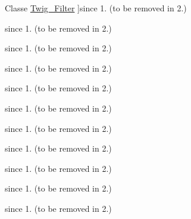 \begin{DoxyRefList}
Classe \hyperlink{class_twig___filter}{Twig\+\_\+\+Filter} ]since 1. (to be removed in 2.)  
\item[\label{deprecated__deprecated000017}%
\hypertarget{deprecated__deprecated000017}{}%
Classe \hyperlink{class_twig___filter___function}{Twig\+\_\+\+Filter\+\_\+\+Function} ]since 1. (to be removed in 2.)  
\item[\label{deprecated__deprecated000018}%
\hypertarget{deprecated__deprecated000018}{}%
Classe \hyperlink{class_twig___filter___method}{Twig\+\_\+\+Filter\+\_\+\+Method} ]since 1. (to be removed in 2.)  
\item[\label{deprecated__deprecated000019}%
\hypertarget{deprecated__deprecated000019}{}%
Classe \hyperlink{class_twig___filter___node}{Twig\+\_\+\+Filter\+\_\+\+Node} ]since 1. (to be removed in 2.)  
\item[\label{deprecated__deprecated000021}%
\hypertarget{deprecated__deprecated000021}{}%
Classe \hyperlink{interface_twig___filter_callable_interface}{Twig\+\_\+\+Filter\+Callable\+Interface} ]since 1. (to be removed in 2.)  
\item[\label{deprecated__deprecated000022}%
\hypertarget{deprecated__deprecated000022}{}%
Classe \hyperlink{interface_twig___filter_interface}{Twig\+\_\+\+Filter\+Interface} ]since 1. (to be removed in 2.)  
\item[\label{deprecated__deprecated000026}%
\hypertarget{deprecated__deprecated000026}{}%
Classe \hyperlink{class_twig___function}{Twig\+\_\+\+Function} ]since 1. (to be removed in 2.)  
\item[\label{deprecated__deprecated000023}%
\hypertarget{deprecated__deprecated000023}{}%
Classe \hyperlink{class_twig___function___function}{Twig\+\_\+\+Function\+\_\+\+Function} ]since 1. (to be removed in 2.)  
\item[\label{deprecated__deprecated000024}%
\hypertarget{deprecated__deprecated000024}{}%
Classe \hyperlink{class_twig___function___method}{Twig\+\_\+\+Function\+\_\+\+Method} ]since 1. (to be removed in 2.)  
\item[\label{deprecated__deprecated000025}%
\hypertarget{deprecated__deprecated000025}{}%
Classe \hyperlink{class_twig___function___node}{Twig\+\_\+\+Function\+\_\+\+Node} ]since 1. (to be removed in 2.)  
\item[\label{deprecated__deprecated000027}%
\hypertarget{deprecated__deprecated000027}{}%
Classe \hyperlink{interface_twig___function_callable_interface}{Twig\+\_\+\+Function\+Callable\+Interface} ]since 1. (to be removed in 2.)  

\end{DoxyRefList}
